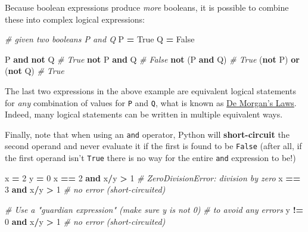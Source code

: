 \documentclass[]{book}
\newenvironment{Shaded}{\begin{snugshade}}{\end{snugshade}}
\newcommand{\KeywordTok}[1]{\textcolor[rgb]{0.13,0.29,0.53}{\textbf{#1}}}
\newcommand{\DecValTok}[1]{\textcolor[rgb]{0.00,0.00,0.81}{#1}}
\newcommand{\CommentTok}[1]{\textcolor[rgb]{0.56,0.35,0.01}{\textit{#1}}}
\newcommand{\VariableTok}[1]{\textcolor[rgb]{0.00,0.00,0.00}{#1}}
\newcommand{\OperatorTok}[1]{\textcolor[rgb]{0.81,0.36,0.00}{\textbf{#1}}}
\newcommand{\NormalTok}[1]{#1}
\begin{document}
Because boolean expressions produce \emph{more} booleans, it is possible
to combine these into complex logical expressions:

\begin{Shaded}
\begin{Highlighting}[]
\CommentTok{# given two booleans P and Q}
\NormalTok{P }\OperatorTok{=} \VariableTok{True}
\NormalTok{Q }\OperatorTok{=} \VariableTok{False}

\NormalTok{P }\KeywordTok{and} \KeywordTok{not}\NormalTok{ Q  }\CommentTok{# True}
\KeywordTok{not}\NormalTok{ P }\KeywordTok{and}\NormalTok{ Q  }\CommentTok{# False}
\KeywordTok{not}\NormalTok{ (P }\KeywordTok{and}\NormalTok{ Q)  }\CommentTok{# True}
\NormalTok{(}\KeywordTok{not}\NormalTok{ P) }\KeywordTok{or}\NormalTok{ (}\KeywordTok{not}\NormalTok{ Q)  }\CommentTok{# True}
\end{Highlighting}
\end{Shaded}

The last two expressions in the above example are equivalent logical
statements for \emph{any} combination of values for \texttt{P} and
\texttt{Q}, what is known as
\href{https://en.wikipedia.org/wiki/De_Morgan\%27s_laws}{De Morgan's
Laws}. Indeed, many logical statements can be written in multiple
equivalent ways.

Finally, note that when using an \texttt{and} operator, Python will
\textbf{short-circuit} the second operand and never evaluate it if the
first is found to be \texttt{False} (after all, if the first operand
isn't \texttt{True} there is no way for the entire \texttt{and}
expression to be!)

\begin{Shaded}
\begin{Highlighting}[]
\NormalTok{x }\OperatorTok{=} \DecValTok{2}
\NormalTok{y }\OperatorTok{=} \DecValTok{0}
\NormalTok{x }\OperatorTok{==} \DecValTok{2} \KeywordTok{and}\NormalTok{ x}\OperatorTok{/}\NormalTok{y }\OperatorTok{>} \DecValTok{1}  \CommentTok{# ZeroDivisionError: division by zero}
\NormalTok{x }\OperatorTok{==} \DecValTok{3} \KeywordTok{and}\NormalTok{ x}\OperatorTok{/}\NormalTok{y }\OperatorTok{>} \DecValTok{1}  \CommentTok{# no error (short-circuited)}

\CommentTok{# Use a "guardian expression" (make sure y is not 0)}
\CommentTok{# to avoid any errors}
\NormalTok{y }\OperatorTok{!=} \DecValTok{0} \KeywordTok{and}\NormalTok{ x}\OperatorTok{/}\NormalTok{y }\OperatorTok{>} \DecValTok{1}  \CommentTok{# no error (short-circuited)}
\end{Highlighting}
\end{Shaded}
\end{document}
